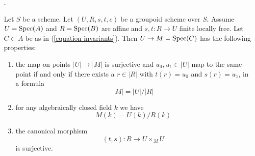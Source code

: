 \begin{lemma}
\label{lemma-points}
\begin{reference}
\cite[Expos\'e 212, Th\'eor\`eme 5.1 (ii) and Corollaire 5.2,
pp. 110--111]{FGA}.
\end{reference}
Let $S$ be a scheme. Let $(U, R, s, t, c)$ be a groupoid scheme over $S$.
Assume $U = \mathop{\mathrm{Spec}}(A)$ and $R = \mathop{\mathrm{Spec}}(B)$ are affine and
$s, t : R \to U$ finite locally free. Let $C \subset A$ be as in
(\ref{equation-invariants}). Then $U \to M = \mathop{\mathrm{Spec}}(C)$ has
the following properties:
\begin{enumerate}
\item the map on points $|U| \to |M|$ is surjective and
$u_0, u_1 \in |U|$ map to the same point if and only if
there exists a $r \in |R|$ with $t(r) = u_0$ and $s(r) = u_1$, in
a formula
$$
|M| = |U|/|R|
$$
\item for any algebraically closed field $k$ we have
$$
M(k) = U(k)/R(k)
$$
\item the canonical morphism
$$
(t, s) : R \longrightarrow U \times_M U
$$
is surjective.
\end{enumerate}
\end{lemma}

